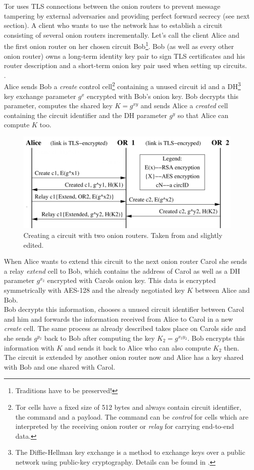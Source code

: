 Tor uses TLS connections between the onion routers to prevent message tampering by external adversaries and providing perfect forward secrecy (see next section). A client who wants to use the network has to establish a circuit consisting of several onion routers incrementally. Let's call the client Alice and the first onion router on her chosen circuit Bob\footnote{
	Traditions have to be preserved!
}. Bob (as well as every other onion router) owns a long-term identity key pair to sign TLS certificates and his router description and a short-term onion key pair used when setting up circuits. .\\ Alice sends Bob a \textit{create} control cell\footnote{
	Tor cells have a fixed size of 512 bytes and always contain circuit identifier, the command and a payload. The command can be \textit{control} for cells which are interpreted by the receiving onion router or \textit{relay} for carrying end-to-end data.
} containing a unused circuit id and a DH\footnote{
	The Diffie-Hellman key exchange is a method to exchange keys over a public network using public-key cryptography. Details can be found in \cite{diffie1976new}.
} key exchange parameter \(g^x\) encrypted with Bob's onion key. Bob decrypts this parameter, computes the shared key \(K = g^{xy}\) and sends Alice a \textit{created} cell containing the circuit identifier and the DH parameter \(g^y\) so that Alice can compute \(K\) too.

\begin{figure}
	\includegraphics[width=\columnwidth]{img/circuit_creation.png}
	\caption{Creating a circuit with two onion routers. Taken from \cite{tor2004original} and slightly edited.}
	\label{img_circuit_creation}
\end{figure}

When Alice wants to extend this circuit to the next onion router Carol she sends a relay \textit{extend} cell to Bob, which contains the address of Carol as well as a DH parameter \(g^{x_2}\) encrypted with Carols onion key. This data is encrypted symmetrically with AES-128 and the already negotiated key \(K\) between Alice and Bob.\\
Bob decrypts this information, chooses a unused circuit identifier between Carol and him and forwards the information received from Alice to Carol in a new \textit{create} cell. The same process as already described takes place on Carols side and she sends \(g^{y_2}\) back to Bob after computing the key \(K_2 = g^{x_2y_2}\). Bob encrypts this information with \(K\) and sends it back to Alice who can also compute \(K_2\) then. The circuit is extended by another onion router now and Alice has a key shared with Bob and one shared with Carol.

